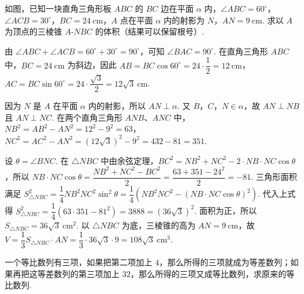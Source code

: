 \documentclass[UTF8,a4paper,oneside,11pt]{ctexbook}
\begin{document}
\begin{problem}
如图，已知一块直角三角形板 \(ABC\) 的 \(BC\) 边在平面 \(\alpha\) 内，\(\angle ABC=60^{\circ}\)，\(\angle ACB=30^{\circ}\)，\(BC=24\mathrm{~cm}\)，\(A\) 点在平面 \(\alpha\) 内的射影为 \(N\)，\(AN=9\mathrm{~cm}\). 求以 \(A\) 为顶点的三棱锥 \(A\text{-}NBC\) 的体积（结果可以保留根号）.

\begin{center}
\end{center}
\end{problem}

\begin{solution}
由 \(\angle ABC+\angle ACB=60^{\circ}+30^{\circ}=90^{\circ}\)，可知 \(\angle BAC=90^{\circ}\). 在直角三角形 \(ABC\) 中，\(BC=24\mathrm{~cm}\) 为斜边，因此 \(AB=BC\cos60^{\circ}=24\cdot\dfrac12=12\mathrm{~cm}\)，\(AC=BC\sin60^{\circ}=24\cdot\dfrac{\sqrt3}{2}=12\sqrt3\mathrm{~cm}\).

因为 \(N\) 是 \(A\) 在平面 \(\alpha\) 内的射影，所以 \(AN\perp\alpha\). 又 \(B\)，\(C\)，\(N\in\alpha\)，故 \(AN\perp NB\) 且 \(AN\perp NC\). 在两个直角三角形 \(ANB\)、\(ANC\) 中，\(NB^2=AB^2-AN^2=12^2-9^2=63\)，\(NC^2=AC^2-AN^2=\left(12\sqrt3\right)^2-9^2=432-81=351\).

设 \(\theta=\angle BNC\). 在 \(\triangle NBC\) 中由余弦定理，\(BC^2=NB^2+NC^2-2\cdot NB\cdot NC\cos\theta\)，所以 \(NB\cdot NC\cos\theta=\dfrac{NB^2+NC^2-BC^2}{2}=\dfrac{63+351-24^2}{2}=-81\). 三角形面积满足 \(S_{\triangle NBC}^2=\dfrac14NB^2NC^2\sin^2\theta=\dfrac14\left(NB^2NC^2-\left(NB\cdot NC\cos\theta\right)^2\right)\). 代入上式得 \(S_{\triangle NBC}^2=\dfrac14\left(63\cdot351-81^2\right)=3888=(36\sqrt3)^2\). 面积为正，所以 \(S_{\triangle NBC}=36\sqrt3\mathrm{~cm}^2\). 以 \(\triangle NBC\) 为底，三棱锥的高为 \(AN=9\mathrm{~cm}\)，故 \(V=\dfrac13S_{\triangle NBC}\cdot AN=\dfrac13\cdot36\sqrt3\cdot9=108\sqrt3\mathrm{~cm}^3\).
\end{solution}

\begin{problem}
一个等比数列有三项，如果把第二项加上 \(4\)，那么所得的三项就成为等差数列；如果再把这等差数列的第三项加上 \(32\)，那么所得的三项又成等比数列，求原来的等比数列.
\end{problem}
\end{document}
